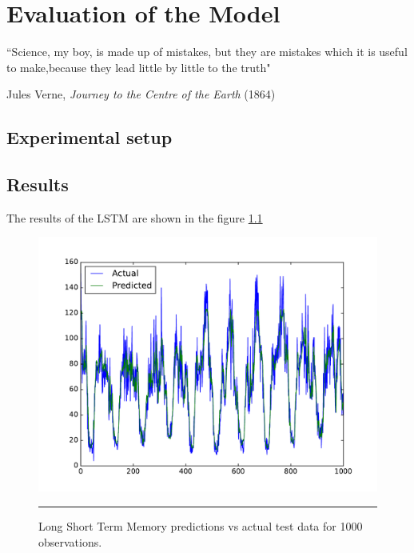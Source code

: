 
\chapter{Evaluation of the Model} %

\label{Chapter5} %


``Science, my boy, is made up of mistakes, but they are mistakes which it is useful to make,because
they lead little by little to the truth"

\begin{flushright}
Jules Verne, \textit{Journey to the Centre of the Earth} (1864)
\end{flushright}


\section{Experimental setup}

\section{Results}

The results of the LSTM are shown in the figure \ref{fig:LstmActualPredicted}

\begin{figure}[htbp]
  \centering
    \includegraphics[width=\textwidth,height=\textheight,keepaspectratio]{Figures/lstm.pdf}
    \rule{35em}{0.5pt}
  \caption[LSTM - Actual vs Predictions]{Long Short Term Memory predictions vs actual test data for
  1000 observations.}
  \label{fig:LstmActualPredicted}
\end{figure}

